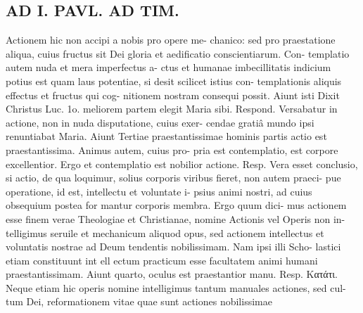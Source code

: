 \documentclass{article}
\begin{document}
\begin{pages}
\section*{AD I. PAVL. AD TIM. }
\marginpar{[ p.14 ]}\pstart Actionem hic non accipi a nobis pro opere me- chanico: sed pro praestatione aliqua, cuius fructus sit Dei gloria et aedificatio conscientiarum. Con- templatio autem nuda et mera imperfectus a- ctus et humanae imbecillitatis indicium potius est quam laus potentiae, si desit scilicet istius con- templationis aliquis effectus et fructus qui cog- nitionem nostram consequi possit. Aiunt isti Dixit Christus Luc. 1o. meliorem partem elegit Maria sibi. Respond. Versabatur in actione, non in nuda disputatione, cuius exer- cendae gratiâ mundo ipsi renuntiabat Maria. Aiunt Tertiae praestantissimae hominis partis actio est praestantissima. Animus autem, cuius pro- pria est contemplatio, est corpore excellentior. Ergo et contemplatio est nobilior actione. Resp. Vera esset conclusio, si actio, de qua loquimur, solius corporis viribus fieret, non autem praeci- pue operatione, id est, intellectu et voluntate i- psius animi nostri, ad cuius obsequium postea for mantur corporis membra. Ergo quum dici- mus actionem esse finem verae Theologiae et Christianae, nomine Actionis vel Operis non in- telligimus seruile et mechanicum aliquod opus, sed actionem intellectus et voluntatis nostrae ad Deum tendentis nobilissimam. Nam ipsi illi Scho- lastici etiam constituunt int ell ectum practicum esse facultatem animi humani praestantissimam. Aiunt quarto, oculus est praestantior manu. Resp. Κατάτι. Neque etiam hic operis nomine intelligimus tantum manuales actiones, sed cul- tum Dei, reformationem vitae quae sunt actiones nobilissimae  \pend

\end{pages}
\end{document}
